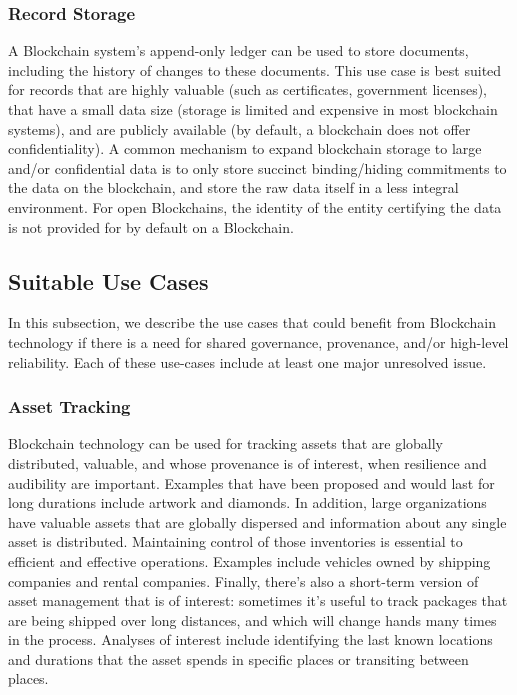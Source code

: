 \subsubsection{Record Storage} %
A Blockchain system's append-only ledger can be used to store documents, including the history of changes to these documents.
This use case is best suited for records that are highly valuable (such as certificates, government licenses), that have a small data size (storage is limited and expensive in most blockchain systems), and are publicly available (by default, a blockchain does not offer confidentiality).
A common mechanism to expand blockchain storage to large and/or confidential data is to only store succinct binding/hiding commitments to the data on the blockchain, and store the raw data itself in a less integral environment.
For open Blockchains, the identity of the entity certifying the data is not provided for by default on a Blockchain.


\subsection{Suitable Use Cases}
In this subsection, we describe the use cases that could benefit from Blockchain technology if there is a need for shared governance, provenance, and/or high-level reliability. Each of these use-cases include at least one major unresolved issue.

\subsubsection{Asset Tracking} Blockchain technology can be used for tracking assets that are globally distributed, valuable, and whose provenance is of interest, when resilience and audibility are important.  Examples that have been proposed and would last for long durations include artwork and diamonds.  In addition, large organizations have valuable assets that are globally dispersed and information about any single asset is distributed.  Maintaining control of those inventories is essential to efficient and effective operations.  Examples include vehicles owned by shipping companies and rental companies.  Finally, there's also a short-term version of asset management that is of interest: sometimes it's useful to track packages that are being shipped over long distances, and which will change hands many times in the process.  Analyses of interest include identifying the last known locations and durations that the asset spends in specific places or transiting between places.

